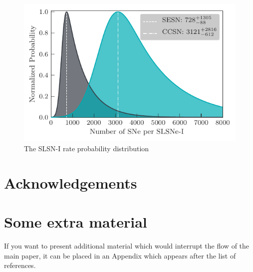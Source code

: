 \documentclass[a4paper,fleqn,usenatbib]{mnras}
\begin{document}
\begin{figure}
	\includegraphics[width=\linewidth]{./bothRateCompare.pdf}
    \caption{The SLSN-I rate probability distribution}
    \label{fig:compare2SLSN}
\end{figure}

\section*{Acknowledgements}





% 




 


\appendix

\section{Some extra material}

If you want to present additional material which would interrupt the flow of the main paper,
it can be placed in an Appendix which appears after the list of references.



\bsp	%
\label{lastpage}
\end{document}
